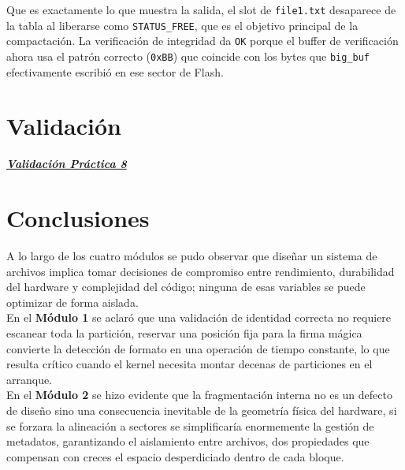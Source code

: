 \documentclass[12pt,letterpaper]{article}
\begin{document}
Que es exactamente lo que muestra la salida, el slot de \texttt{file1.txt} desaparece de la tabla al liberarse
como \texttt{STATUS\_FREE}, que es el objetivo principal de la compactación. La verificación de integridad da
\texttt{OK} porque el buffer de verificación ahora usa el patrón correcto (\texttt{0xBB}) que coincide con los
bytes que \texttt{big\_buf} efectivamente escribió en ese sector de Flash.

\bigskip
\bigskip

\section*{Validación}
\href{https://drive.google.com/file/d/1c6mV241si3NMov_RdYtxfNRheqxAPOdA/view?usp=sharing}
     {\textbf{\textit{\textcolor{linkblue}{Validación Práctica 8}}}}\\

\newpage


\section*{Conclusiones}

A lo largo de los cuatro módulos se pudo observar que diseñar un sistema de archivos implica tomar decisiones
de compromiso entre rendimiento, durabilidad del hardware y complejidad del código; ninguna de esas variables
se puede optimizar de forma aislada.\\

En el \textbf{Módulo 1} se aclaró que una validación de identidad correcta no requiere escanear toda la
partición, reservar una posición fija para la firma mágica convierte la detección de formato en una operación de
tiempo constante, lo que resulta crítico cuando el kernel necesita montar decenas de particiones en el arranque.
\\

En el \textbf{Módulo 2} se hizo evidente que la fragmentación interna no es un defecto de diseño sino una
consecuencia inevitable de la geometría física del hardware, si se forzara la alineación a sectores se
simplificaría enormemente la gestión de metadatos, garantizando el aislamiento entre archivos, dos propiedades
que compensan con creces el espacio desperdiciado dentro de cada bloque.\\
\end{document}
